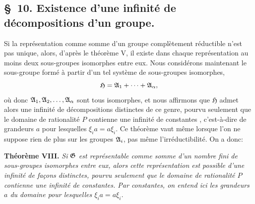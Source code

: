 \subsection*{\S~10. Existence d'une infinité de décompositions d'un groupe.}

Si la représentation comme somme d'un groupe complètement réductible n'est pas unique, alors, d'après le théorème V, il existe dans chaque représentation au moins deux sous-groupes isomorphes entre eux. Nous considérons maintenant le sous-groupe formé à partir d'un tel système de sous-groupes isomorphes,
\[
  \mathfrak H=\mathfrak{A}_1+\cdots+\mathfrak{A}_\alpha,
\]
où donc $\mathfrak{A}_1,\mathfrak{A}_2,\ldots,\mathfrak{A}_\alpha$ sont tous isomorphes, et nous affirmons que $\mathfrak H$ admet alors une infinité de décompositions distinctes de ce genre, pourvu seulement que le domaine de rationalité $P$ contienne une infinité de \og{} constantes \fg{}, c'est-à-dire de grandeurs $a$ pour lesquelles $\xi_i a=a\xi_i$. Ce théorème vaut même lorsque l'on ne suppose rien de plus sur les groupes $\mathfrak{A}_i$, pas même l'irréductibilité. On a donc:

\textbf{Théorème VIII.} \emph{Si $\mathfrak{G}$ est représentable comme somme d'un nombre fini de sous-groupes isomorphes entre eux, alors cette représentation est possible d'une infinité de façons distinctes, pourvu seulement que le domaine de rationalité $P$ contienne une infinité de constantes. Par constantes, on entend ici les grandeurs $a$ du domaine pour lesquelles $\xi_i a=a\xi_i$.}

